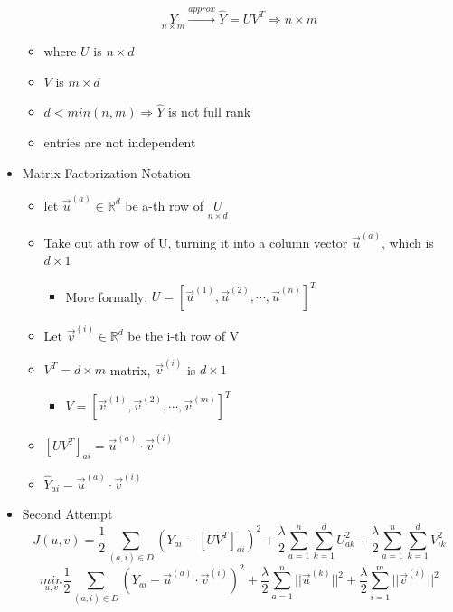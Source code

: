 \documentclass[10pt, oneside]{article}
\newcommand{\R}{\mathbb{R}}
\begin{document}
\begin{itemize}
\begin{itemize}
    \end{itemize}
    \[\underset{n\times m}{Y} \overset{approx}{\rightarrow} \hat Y = UV^T \Rightarrow n\times m\]
    \begin{itemize}
        \item where $U$ is $n\times d$
        \item $V$ is $m\times d$
        \item $d < min(n,m) \Rightarrow \hat Y$ is not full rank
        \item entries are not independent
    \end{itemize}
    \item Matrix Factorization Notation
    \begin{itemize}
        \item let $\vec u^{(a)} \in \R^d$ be a-th row of $\underset{n\times d}{U}$
        \item Take out ath row of U, turning it into a column vector $\vec u^{(a)}$, which is $d\times 1$
        \begin{itemize}
            \item More formally: $U = [\vec u^{(1)}, \vec u^{(2)}, \cdots, \vec u^{(n)}]^T$
        \end{itemize}
        \item Let $\vec v^{(i)} \in \R^d$ be the i-th row of V
        \item $V^T = d\times m$ matrix, $\vec v^(i)$ is $d\times 1$
        \begin{itemize}
            \item $V = [\vec v^{(1)}, \vec v^{(2)}, \cdots, \vec v^{(m)}]^T$
        \end{itemize}
        \item $[UV^T]_{ai} = \vec u^{(a)} \cdot \vec v^{(i)}$
        \item $\hat Y_{ai} = \vec u^{(a)} \cdot \vec v^{(i)}$
    \end{itemize}
    \item Second Attempt
    \[J(u,v) = \frac{1}{2}\underset{(a,i)\in D}{\sum} (Y_{ai} - [UV^T]_{ai})^2 + \frac{\lambda}{2} \overset{n}{\underset{a=1}{\sum}}\overset{d}{\underset{k=1}{\sum}} U_{ak}^2 + \frac{\lambda}{2} \overset{n}{\underset{a=1}{\sum}}\overset{d}{\underset{k=1}{\sum}} V_{ik}^2  \]
    \[\underset{u,v}{min} \frac{1}{2} \underset{(a,i)\in D}{\sum} (Y_{ai} - \vec u^{(a)} \cdot \vec v^{(i)})^2 + \frac{\lambda}{2} \sum_{a=1}^n ||\vec u^{(k)} ||^2 + \frac{\lambda}{2} \sum_{i=1}^m ||\vec v^{(i)}||^2\]
    \begin{itemize}

\end{itemize}
\end{itemize}
\end{document}
